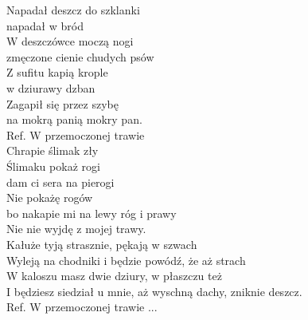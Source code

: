 \begin{flushleft}
Napadał deszcz do szklanki \tab{}\\
napadał w bród  \tab{}\\
W deszczówce moczą nogi \tab{}\\
zmęczone cienie chudych psów \tab{}\\
\hops
Z sufitu kapią krople\tab{}\\
w dziurawy dzban \tab{}\\
Zagapił się przez szybę\tab{}\\
na mokrą panią mokry pan. \tab{}\\
\hops
Ref. W przemoczonej trawie \tab{}\\
\hspace{0.9cm}Chrapie ślimak zły \tab{}\\
\hspace{0.9cm}Ślimaku pokaż rogi\tab{}\\
\hspace{0.9cm}dam ci sera na pierogi \tab{}\\
\hspace{0.9cm}Nie pokażę rogów\tab{}\\
\hspace{0.9cm}bo nakapie mi na lewy róg i prawy \\
\hspace{0.9cm}Nie nie wyjdę z mojej trawy. \\
\hops
Kałuże tyją strasznie, pękają w szwach\\
Wyleją na chodniki i będzie powódź, że aż strach\\
\hops
W kaloszu masz dwie dziury, w płaszczu też\\
I będziesz siedział u mnie, aż wyschną dachy, zniknie deszcz. \\
\hops
Ref. W przemoczonej trawie ...
\end{flushleft}
\newpage